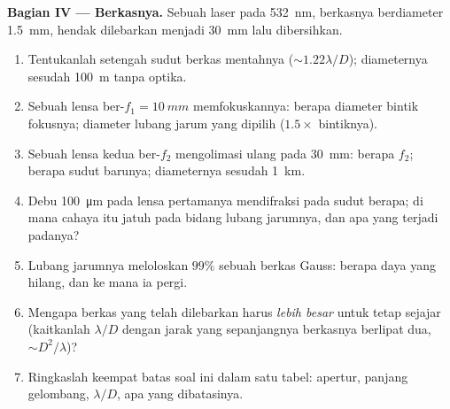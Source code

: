\begin{problem}
\medskip
\noindent\textbf{Bagian IV --- Berkasnya.}
Sebuah laser pada \qty{532}{nm}, berkasnya berdiameter \qty{1.5}{mm}, hendak dilebarkan menjadi
\qty{30}{mm} lalu dibersihkan.
\begin{enumerate}[resume]
  \item Tentukanlah setengah sudut  berkas mentahnya ($\sim1.22\lambda/D$);
        diameternya sesudah \qty{100}{m} tanpa optika.
  \item Sebuah lensa ber-$f_1 = \qty{10}{mm}$ memfokuskannya: berapa diameter bintik fokusnya;
        diameter lubang jarum yang dipilih ($1.5\times$ bintiknya).
  \item Sebuah lensa kedua ber-$f_2$ mengolimasi ulang pada \qty{30}{mm}: berapa $f_2$; berapa
        sudut  barunya; diameternya sesudah \qty{1}{km}.
  \item Debu \qty{100}{\micro m} pada lensa pertamanya mendifraksi pada sudut berapa;
        di mana cahaya itu jatuh pada bidang lubang jarumnya, dan apa
        yang terjadi padanya?
  \item Lubang jarumnya meloloskan $99\%$ sebuah berkas Gauss: berapa daya yang hilang, dan
        ke mana ia pergi.
  \item Mengapa berkas yang telah dilebarkan harus \emph{lebih besar} untuk tetap sejajar
        (kaitkanlah $\lambda/D$ dengan jarak yang sepanjangnya berkasnya berlipat dua,
        $\sim D^2/\lambda$)?
  \item Ringkaslah keempat batas soal ini dalam satu tabel: apertur,
        panjang gelombang, $\lambda/D$, apa yang dibatasinya.
\end{enumerate}
\end{problem}
